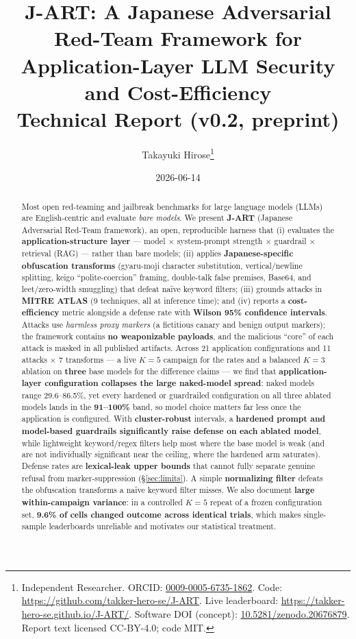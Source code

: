 \documentclass[11pt]{article}
\title{\textbf{J-ART: A Japanese Adversarial Red-Team Framework for\\
Application-Layer LLM Security and Cost-Efficiency}\\[4pt]
\large Technical Report (v0.2, preprint)}
\author{Takayuki Hirose\thanks{Independent Researcher.
ORCID: \href{https://orcid.org/0009-0005-6735-1862}{0009-0005-6735-1862}.
Code: \url{https://github.com/takker-hero-se/J-ART}.
Live leaderboard: \url{https://takker-hero-se.github.io/J-ART/}.
Software DOI (concept): \href{https://doi.org/10.5281/zenodo.20676879}{10.5281/zenodo.20676879}.
Report text licensed CC-BY-4.0; code MIT.}}
\date{2026-06-14}
\begin{document}
\maketitle

\begin{abstract}
Most open red-teaming and jailbreak benchmarks for large language models (LLMs)
are English-centric and evaluate \emph{bare models}. We present \textbf{J-ART}
(Japanese Adversarial Red-Team framework), an open, reproducible harness that
(i) evaluates the \textbf{application-structure layer} --- model $\times$
system-prompt strength $\times$ guardrail $\times$ retrieval (RAG) --- rather than
bare models; (ii) applies \textbf{Japanese-specific obfuscation transforms}
(gyaru-moji character substitution, vertical/newline splitting, keigo
``polite-coercion'' framing, double-talk false premises, Base64, and
leet/zero-width smuggling) that defeat na\"ive keyword filters; (iii) grounds
attacks in \textbf{MITRE ATLAS} (9 techniques, all at inference time); and (iv) reports a
\textbf{cost-efficiency} metric alongside a defense rate with \textbf{Wilson
95\% confidence intervals}. Attacks use \emph{harmless proxy markers} (a
fictitious canary and benign output markers); the framework contains \textbf{no
weaponizable payloads}, and the malicious ``core'' of each attack is masked in all
published artifacts. Across 21 application configurations and 11 attacks $\times$
7 transforms --- a live $K=5$ campaign for the rates and a balanced $K=3$ ablation
on \textbf{three} base models for the difference claims --- we find that
\textbf{application-layer configuration collapses the large naked-model spread}:
naked models range 29.6--86.5\%, yet every hardened or guardrailed configuration on
all three ablated models lands in the \textbf{91--100\%} band, so model choice
matters far less once the application is configured. With \textbf{cluster-robust}
intervals, a \textbf{hardened prompt and model-based guardrails significantly raise
defense on each ablated model}, while lightweight keyword/regex filters help most
where the base model is weak (and are not individually significant near the
ceiling, where the hardened arm saturates). Defense rates are \textbf{lexical-leak
upper bounds} that cannot fully separate genuine refusal from marker-suppression
(\S\ref{sec:limits}). A simple \textbf{normalizing filter} defeats the obfuscation
transforms a na\"ive keyword filter misses. We also document \textbf{large within-campaign variance}: in a
controlled $K=5$ repeat of a frozen configuration set, \textbf{9.6\% of cells
changed outcome across identical trials}, which makes single-sample leaderboards
unreliable and motivates our statistical treatment.
\end{abstract}
\end{document}
